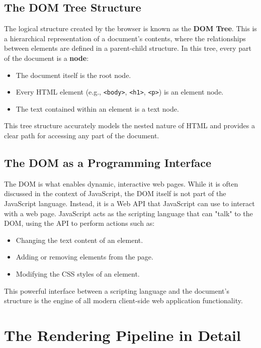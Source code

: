 \documentclass{scrbook}
\begin{document}
\subsection{The DOM Tree Structure}

The logical structure created by the browser is known as the \textbf{DOM Tree}. This is a hierarchical representation of a document's contents, where the relationships between elements are defined in a parent-child structure. In this tree, every part of the document is a \textbf{node}:

\begin{itemize}
    \item The document itself is the root node.
    \item Every HTML element (e.g., \texttt{<body>}, \texttt{<h1>}, \texttt{<p>}) is an element node.
    \item The text contained within an element is a text node.
\end{itemize}

This tree structure accurately models the nested nature of HTML and provides a clear path for accessing any part of the document.

\subsection{The DOM as a Programming Interface}

The DOM is what enables dynamic, interactive web pages. While it is often discussed in the context of JavaScript, the DOM itself is not part of the JavaScript language. Instead, it is a Web API that JavaScript can use to interact with a web page. JavaScript acts as the scripting language that can "talk" to the DOM, using the API to perform actions such as:

\begin{itemize}
    \item Changing the text content of an element.
    \item Adding or removing elements from the page.
    \item Modifying the CSS styles of an element.
\end{itemize}

This powerful interface between a scripting language and the document's structure is the engine of all modern client-side web application functionality.

\section{The Rendering Pipeline in Detail}
\end{document}
